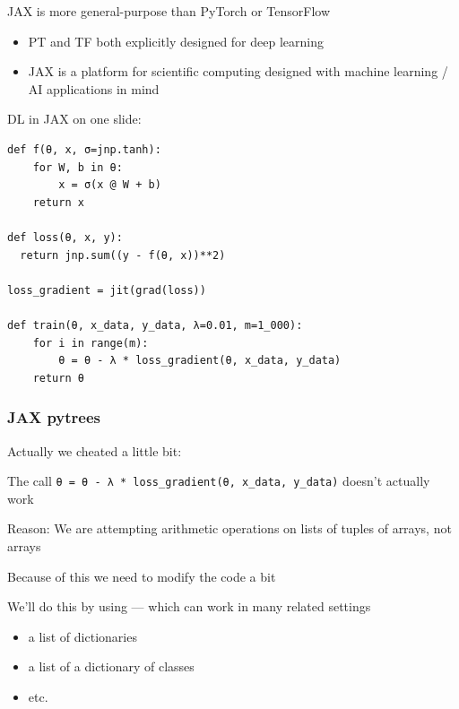\documentclass[xcolor=dvipsnames, 10pt]{beamer}
\begin{document}
\begin{frame}
    
    JAX is more general-purpose than PyTorch or TensorFlow 

    \begin{itemize}
        \item PT and TF both explicitly designed for deep learning
            \medskip
        \item JAX is a platform for scientific computing designed with machine
            learning / AI applications in mind
    \end{itemize}


    \medskip
    \medskip
    \medskip
    \medskip
    DL in JAX on one slide:

\end{frame}



\begin{frame}[fragile]

    \begin{verbatim}
def f(θ, x, σ=jnp.tanh):
    for W, b in θ:
        x = σ(x @ W + b)
    return x

def loss(θ, x, y):
  return jnp.sum((y - f(θ, x))**2)

loss_gradient = jit(grad(loss))

def train(θ, x_data, y_data, λ=0.01, m=1_000):
    for i in range(m):
        θ = θ - λ * loss_gradient(θ, x_data, y_data)
    return θ
    \end{verbatim}

\end{frame}

\begin{frame}
    \frametitle{JAX pytrees}

    Actually we cheated a little bit:

    The call \texttt{θ = θ - λ * loss\_gradient(θ, x\_data, y\_data)} doesn't
    actually work 

    Reason: We are attempting arithmetic operations on lists of tuples of arrays, not arrays

    Because of this we need to modify the code a bit

    We'll do this by using  --- which can work in many related settings

    \begin{itemize}
        \item a list of dictionaries
        \item a list of a dictionary of classes
        \item etc.
    \end{itemize}

\end{frame}
\end{document}

